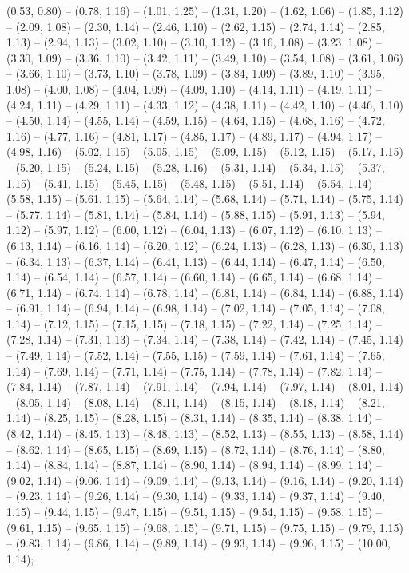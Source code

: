 (0.53,	0.80) --
(0.78,	1.16) --
(1.01,	1.25) --
(1.31,	1.20) --
(1.62,	1.06) --
(1.85,	1.12) --
(2.09,	1.08) --
(2.30,	1.14) --
(2.46,	1.10) --
(2.62,	1.15) --
(2.74,	1.14) --
(2.85,	1.13) --
(2.94,	1.13) --
(3.02,	1.10) --
(3.10,	1.12) --
(3.16,	1.08) --
(3.23,	1.08) --
(3.30,	1.09) --
(3.36,	1.10) --
(3.42,	1.11) --
(3.49,	1.10) --
(3.54,	1.08) --
(3.61,	1.06) --
(3.66,	1.10) --
(3.73,	1.10) --
(3.78,	1.09) --
(3.84,	1.09) --
(3.89,	1.10) --
(3.95,	1.08) --
(4.00,	1.08) --
(4.04,	1.09) --
(4.09,	1.10) --
(4.14,	1.11) --
(4.19,	1.11) --
(4.24,	1.11) --
(4.29,	1.11) --
(4.33,	1.12) --
(4.38,	1.11) --
(4.42,	1.10) --
(4.46,	1.10) --
(4.50,	1.14) --
(4.55,	1.14) --
(4.59,	1.15) --
(4.64,	1.15) --
(4.68,	1.16) --
(4.72,	1.16) --
(4.77,	1.16) --
(4.81,	1.17) --
(4.85,	1.17) --
(4.89,	1.17) --
(4.94,	1.17) --
(4.98,	1.16) --
(5.02,	1.15) --
(5.05,	1.15) --
(5.09,	1.15) --
(5.12,	1.15) --
(5.17,	1.15) --
(5.20,	1.15) --
(5.24,	1.15) --
(5.28,	1.16) --
(5.31,	1.14) --
(5.34,	1.15) --
(5.37,	1.15) --
(5.41,	1.15) --
(5.45,	1.15) --
(5.48,	1.15) --
(5.51,	1.14) --
(5.54,	1.14) --
(5.58,	1.15) --
(5.61,	1.15) --
(5.64,	1.14) --
(5.68,	1.14) --
(5.71,	1.14) --
(5.75,	1.14) --
(5.77,	1.14) --
(5.81,	1.14) --
(5.84,	1.14) --
(5.88,	1.15) --
(5.91,	1.13) --
(5.94,	1.12) --
(5.97,	1.12) --
(6.00,	1.12) --
(6.04,	1.13) --
(6.07,	1.12) --
(6.10,	1.13) --
(6.13,	1.14) --
(6.16,	1.14) --
(6.20,	1.12) --
(6.24,	1.13) --
(6.28,	1.13) --
(6.30,	1.13) --
(6.34,	1.13) --
(6.37,	1.14) --
(6.41,	1.13) --
(6.44,	1.14) --
(6.47,	1.14) --
(6.50,	1.14) --
(6.54,	1.14) --
(6.57,	1.14) --
(6.60,	1.14) --
(6.65,	1.14) --
(6.68,	1.14) --
(6.71,	1.14) --
(6.74,	1.14) --
(6.78,	1.14) --
(6.81,	1.14) --
(6.84,	1.14) --
(6.88,	1.14) --
(6.91,	1.14) --
(6.94,	1.14) --
(6.98,	1.14) --
(7.02,	1.14) --
(7.05,	1.14) --
(7.08,	1.14) --
(7.12,	1.15) --
(7.15,	1.15) --
(7.18,	1.15) --
(7.22,	1.14) --
(7.25,	1.14) --
(7.28,	1.14) --
(7.31,	1.13) --
(7.34,	1.14) --
(7.38,	1.14) --
(7.42,	1.14) --
(7.45,	1.14) --
(7.49,	1.14) --
(7.52,	1.14) --
(7.55,	1.15) --
(7.59,	1.14) --
(7.61,	1.14) --
(7.65,	1.14) --
(7.69,	1.14) --
(7.71,	1.14) --
(7.75,	1.14) --
(7.78,	1.14) --
(7.82,	1.14) --
(7.84,	1.14) --
(7.87,	1.14) --
(7.91,	1.14) --
(7.94,	1.14) --
(7.97,	1.14) --
(8.01,	1.14) --
(8.05,	1.14) --
(8.08,	1.14) --
(8.11,	1.14) --
(8.15,	1.14) --
(8.18,	1.14) --
(8.21,	1.14) --
(8.25,	1.15) --
(8.28,	1.15) --
(8.31,	1.14) --
(8.35,	1.14) --
(8.38,	1.14) --
(8.42,	1.14) --
(8.45,	1.13) --
(8.48,	1.13) --
(8.52,	1.13) --
(8.55,	1.13) --
(8.58,	1.14) --
(8.62,	1.14) --
(8.65,	1.15) --
(8.69,	1.15) --
(8.72,	1.14) --
(8.76,	1.14) --
(8.80,	1.14) --
(8.84,	1.14) --
(8.87,	1.14) --
(8.90,	1.14) --
(8.94,	1.14) --
(8.99,	1.14) --
(9.02,	1.14) --
(9.06,	1.14) --
(9.09,	1.14) --
(9.13,	1.14) --
(9.16,	1.14) --
(9.20,	1.14) --
(9.23,	1.14) --
(9.26,	1.14) --
(9.30,	1.14) --
(9.33,	1.14) --
(9.37,	1.14) --
(9.40,	1.15) --
(9.44,	1.15) --
(9.47,	1.15) --
(9.51,	1.15) --
(9.54,	1.15) --
(9.58,	1.15) --
(9.61,	1.15) --
(9.65,	1.15) --
(9.68,	1.15) --
(9.71,	1.15) --
(9.75,	1.15) --
(9.79,	1.15) --
(9.83,	1.14) --
(9.86,	1.14) --
(9.89,	1.14) --
(9.93,	1.14) --
(9.96,	1.15) --
(10.00,	1.14);